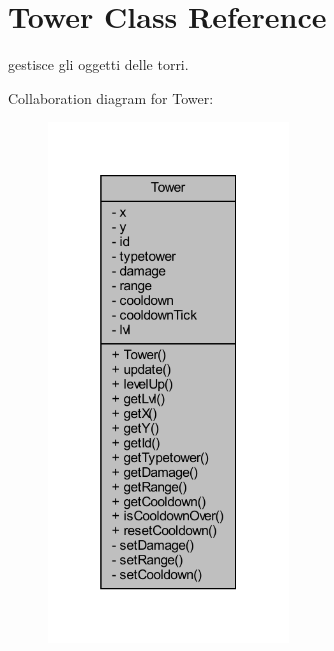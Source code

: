 \hypertarget{classtowers_1_1_tower}{}\section{Tower Class Reference}
\label{classtowers_1_1_tower}


gestisce gli oggetti delle torri.  




Collaboration diagram for Tower\+:\nopagebreak
\begin{figure}[H]
\begin{center}
\leavevmode
\includegraphics[width=181pt]{classtowers_1_1_tower__coll__graph}
\end{center}
\end{figure}
